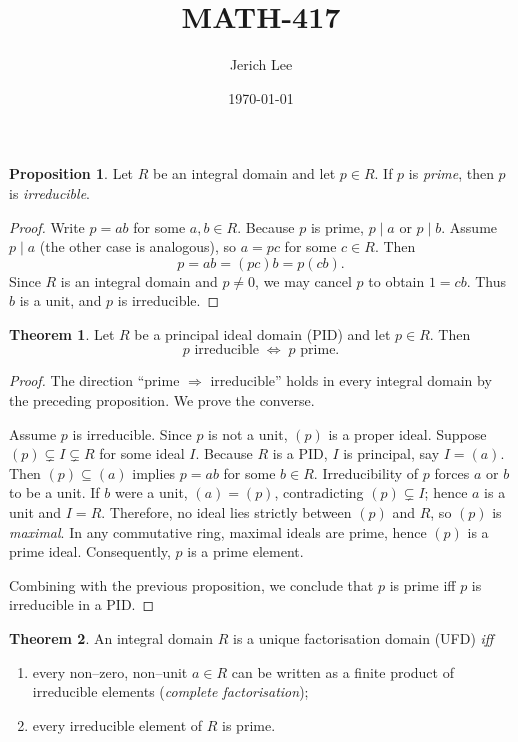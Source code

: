 \documentclass[12pt]{article}
\title{MATH-417}
\author{Jerich Lee}
\date{\today}
\theoremstyle{definition} %
\newtheorem{proposition}{Proposition}
\newtheorem{theorem}{Theorem}
\theoremstyle{plain} %
\begin{document}
\maketitle
\begin{proposition}
  Let $R$ be an integral domain and let $p\in R$.  
  If $p$ is \emph{prime}, then $p$ is \emph{irreducible}.
  \end{proposition}
  
  \begin{proof}
  Write $p=ab$ for some $a,b\in R$.  
  Because $p$ is prime, $p\mid a$ or $p\mid b$.  
  Assume $p\mid a$ (the other case is analogous), so $a=pc$ for some $c\in R$.  
  Then
  \[
  p=ab=(pc)b=p(cb).
  \]
  Since $R$ is an integral domain and $p\neq 0$, we may cancel $p$ to obtain $1=cb$.  
  Thus $b$ is a unit, and $p$ is irreducible.
  \end{proof}
  
  \medskip
  
  \begin{theorem}
  Let $R$ be a principal ideal domain (PID) and let $p\in R$.  
  Then
  \[
    p \text{ irreducible} \;\Longleftrightarrow\; p \text{ prime}.
  \]
  \end{theorem}
  
  \begin{proof}
  The direction ``prime $\Rightarrow$ irreducible'' holds in every integral
  domain by the preceding proposition.  
  We prove the converse.
  
  \smallskip
  Assume $p$ is irreducible.  
  Since $p$ is not a unit, $(p)$ is a proper ideal.  
  Suppose $(p)\subsetneq I\subsetneq R$ for some ideal $I$.  
  Because $R$ is a PID, $I$ is principal, say $I=(a)$.  
  Then $(p)\subseteq(a)$ implies $p=ab$ for some $b\in R$.  
  Irreducibility of $p$ forces $a$ or $b$ to be a unit.  
  If $b$ were a unit, $(a)=(p)$, contradicting $(p)\subsetneq I$; hence $a$
  is a unit and $I=R$.  
  Therefore, no ideal lies strictly between $(p)$ and $R$, so $(p)$ is
  \emph{maximal}.  
  In any commutative ring, maximal ideals are prime, hence $(p)$ is a prime
  ideal.  
  Consequently, $p$ is a prime element.
  
  Combining with the previous proposition, we conclude that $p$ is prime
  iff $p$ is irreducible in a PID.
  \end{proof}
  \begin{theorem}
    \label{thm:UFD-characterisation}
    An integral domain $R$ is a unique factorisation domain (UFD) \emph{iff}
    \begin{enumerate}
      \item\label{UFD-existence}
        every non--zero, non--unit $a\in R$ can be written as a finite
        product of irreducible elements (\emph{complete factorisation});
      \item\label{UFD-prime}
        every irreducible element of $R$ is prime.
    \end{enumerate}
    \end{theorem}
    
\end{document}
